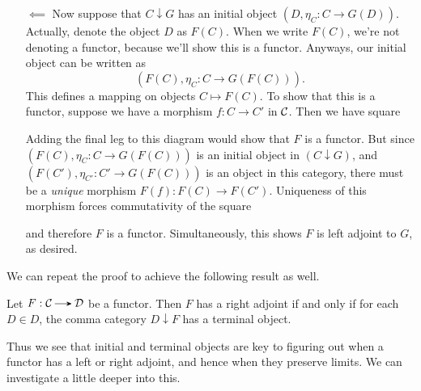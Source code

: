\begin{prf}
\begin{itemize}
            \item[$\impliedby$] Now suppose that $C \downarrow G$ has an 
            initial object $(D, \eta_C: C \to G(D))$. Actually, denote 
            the object $D$ as $F(C)$. When we write $F(C)$, we're not denoting 
            a functor, because we'll show this is a functor. Anyways, our initial 
            object can be written as 
            \[
                (F(C), \eta_C: C \to G(F(C))).
            \]
            This defines a mapping on objects $C \mapsto F(C)$. To show that this 
            is a functor, suppose we have a morphism $f: C \to C'$ in $\mathcal{C}$. Then 
            we have square 
            \begin{center}
            \end{center}
            Adding the final leg to this diagram would show that $F$ is a functor. But 
            since $(F(C), \eta_C: C \to G(F(C)))$ is an initial object in $(C \downarrow G)$, 
            and $(F(C'), \eta_{C'}: C' \to G(F(C)))$ is an object in this category, 
            there must be a \textit{unique} morphism $F(f):F(C) \to F(C')$. Uniqueness of 
            this morphism forces commutativity of the square 
            \begin{center}
            \end{center}
            and therefore $F$ is a functor. Simultaneously, this shows $F$ is left adjoint 
            to $G$, as desired. 
        \end{itemize}
    \end{prf}  
    We can repeat the proof to achieve the following result as well.
    \begin{corollary}
        Let $F: \cc \to \dd$ be a functor. Then $F$ has a right adjoint if and only 
        if for each $D \in D$, the comma category $D \downarrow F$ has a terminal 
        object. 
    \end{corollary}
    Thus we see that initial and terminal objects are key to figuring out 
    when a functor has a left or right adjoint, and hence when they preserve limits.
    We can investigate a little deeper into this. 

